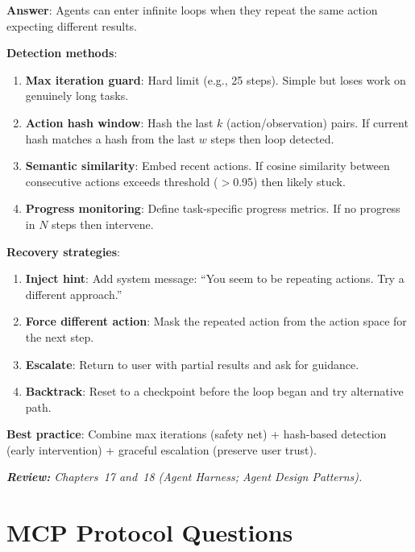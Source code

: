 \begin{questionbox}
\textbf{Answer}: Agents can enter infinite loops when they repeat the same action expecting different results.

\textbf{Detection methods}:

\begin{enumerate}
  \item \textbf{Max iteration guard}: Hard limit (e.g., 25 steps). Simple but loses work on genuinely long tasks.
  \item \textbf{Action hash window}: Hash the last $k$ (action/observation) pairs. If current hash matches a hash from the last $w$ steps then loop detected.
  \item \textbf{Semantic similarity}: Embed recent actions. If cosine similarity between consecutive actions exceeds threshold ($>$0.95) then likely stuck.
  \item \textbf{Progress monitoring}: Define task-specific progress metrics. If no progress in $N$ steps then intervene.
\end{enumerate}

\textbf{Recovery strategies}:

\begin{enumerate}
  \item \textbf{Inject hint}: Add system message: ``You seem to be repeating actions. Try a different approach.''
  \item \textbf{Force different action}: Mask the repeated action from the action space for the next step.
  \item \textbf{Escalate}: Return to user with partial results and ask for guidance.
  \item \textbf{Backtrack}: Reset to a checkpoint before the loop began and try alternative path.
\end{enumerate}

\textbf{Best practice}: Combine max iterations (safety net) + hash-based detection (early intervention) + graceful escalation (preserve user trust).

\emph{\textbf{Review:} Chapters~17 and~18 (Agent Harness; Agent Design Patterns).}
\end{questionbox}

\newpage
\section{MCP Protocol Questions}
\label{mcp-protocol-questions}

